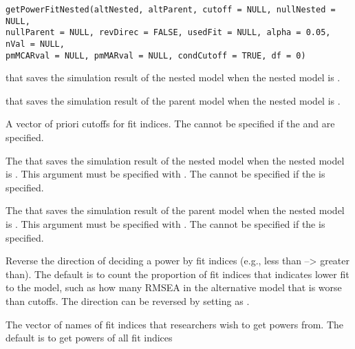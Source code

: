 \documentclass[a4paper]{book}
\begin{document}
%
\begin{Usage}
\begin{verbatim}
getPowerFitNested(altNested, altParent, cutoff = NULL, nullNested = NULL, 
nullParent = NULL, revDirec = FALSE, usedFit = NULL, alpha = 0.05, nVal = NULL, 
pmMCARval = NULL, pmMARval = NULL, condCutoff = TRUE, df = 0)
\end{verbatim}
\end{Usage}
%
\begin{Arguments}
\begin{ldescription}
\item[\code{altNested}] 
 that saves the simulation result of the nested model when the nested model is .

\item[\code{altParent}] 
 that saves the simulation result of the parent model when the nested model is .

\item[\code{cutoff}] 
A vector of priori cutoffs for fit indices. The  cannot be specified if the  and  are specified.

\item[\code{nullNested}] 
The  that saves the simulation result of the nested model when the nested model is . This argument must be specified with . The  cannot be specified if the  is specified.

\item[\code{nullParent}] 
The  that saves the simulation result of the parent model when the nested model is . This argument must be specified with . The  cannot be specified if the  is specified.

\item[\code{revDirec}] 
Reverse the direction of deciding a power by fit indices (e.g., less than --> greater than). The default is to count the proportion of fit indices that indicates lower fit to the model, such as how many RMSEA in the alternative model that is worse than cutoffs. The direction can be reversed by setting as .

\item[\code{usedFit}] 
The vector of names of fit indices that researchers wish to get powers from. The default is to get powers of all fit indices


\end{ldescription}
\end{Arguments}
\end{document}
